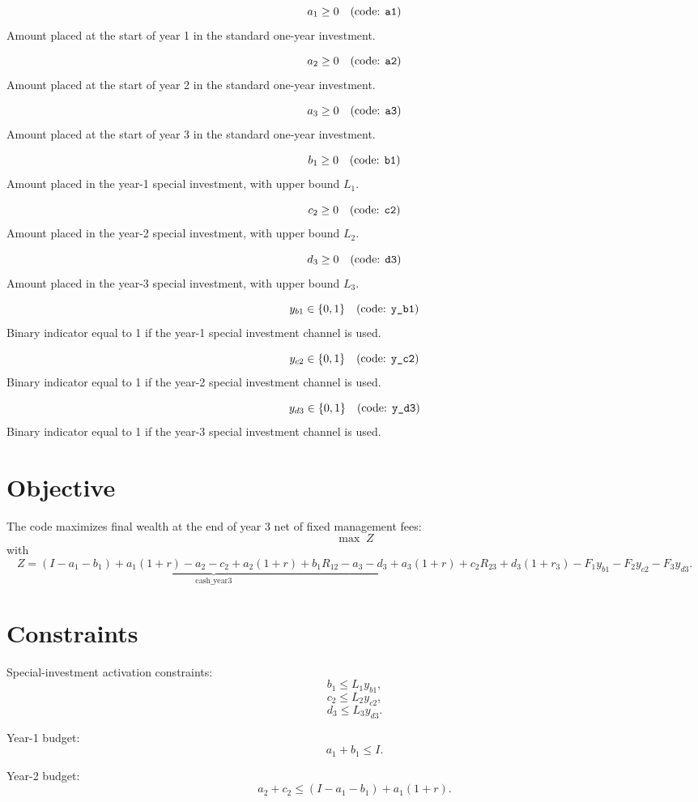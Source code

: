 \[
a_1 \ge 0 \quad \text{(code: \texttt{a1})}
\]
Amount placed at the start of year 1 in the standard one-year investment.

\[
a_2 \ge 0 \quad \text{(code: \texttt{a2})}
\]
Amount placed at the start of year 2 in the standard one-year investment.

\[
a_3 \ge 0 \quad \text{(code: \texttt{a3})}
\]
Amount placed at the start of year 3 in the standard one-year investment.

\[
b_1 \ge 0 \quad \text{(code: \texttt{b1})}
\]
Amount placed in the year-1 special investment, with upper bound \(L_1\).

\[
c_2 \ge 0 \quad \text{(code: \texttt{c2})}
\]
Amount placed in the year-2 special investment, with upper bound \(L_2\).

\[
d_3 \ge 0 \quad \text{(code: \texttt{d3})}
\]
Amount placed in the year-3 special investment, with upper bound \(L_3\).

\[
y_{b1} \in \{0,1\} \quad \text{(code: \texttt{y\_b1})}
\]
Binary indicator equal to 1 if the year-1 special investment channel is used.

\[
y_{c2} \in \{0,1\} \quad \text{(code: \texttt{y\_c2})}
\]
Binary indicator equal to 1 if the year-2 special investment channel is used.

\[
y_{d3} \in \{0,1\} \quad \text{(code: \texttt{y\_d3})}
\]
Binary indicator equal to 1 if the year-3 special investment channel is used.

\section*{Objective}

The code maximizes final wealth at the end of year 3 net of fixed management fees:
\[
\max \; Z
\]
with
\[
Z=
\underbrace{\left(I-a_1-b_1\right)+a_1(1+r)-a_2-c_2+a_2(1+r)+b_1R_{12}-a_3-d_3}_{\text{cash\_year3}}
+ a_3(1+r) + c_2R_{23} + d_3(1+r_3)
- F_1y_{b1} - F_2y_{c2} - F_3y_{d3}.
\]

\section*{Constraints}

Special-investment activation constraints:
\[
b_1 \le L_1 y_{b1},
\]
\[
c_2 \le L_2 y_{c2},
\]
\[
d_3 \le L_3 y_{d3}.
\]

Year-1 budget:
\[
a_1 + b_1 \le I.
\]

Year-2 budget:
\[
a_2 + c_2 \le (I-a_1-b_1)+a_1(1+r).
\]

